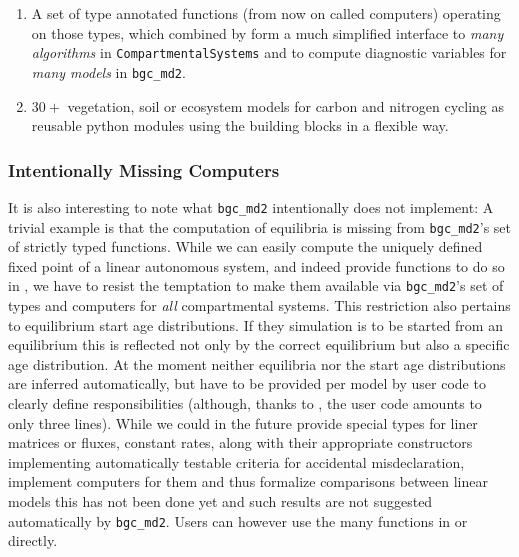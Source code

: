 \begin{enumerate}
\begin{figure}[h]
      \label{fig:subsystems}
      \end{figure}
      
    \item
      A set of type annotated functions (from now on called computers) operating on those types,  which combined
      by \ComputabilityGraphs{} form a much simplified 
      interface to \emph{many  algorithms} in \texttt{CompartmentalSystems} and \LAPM{} to compute diagnostic variables
      for \emph{many models} in \texttt{bgc\_md2}.
    \item
    $30+$ vegetation, soil or ecosystem models for carbon and nitrogen cycling
      as reusable python modules using the building blocks in a flexible way. 
  \end{enumerate}

\subsubsection{Intentionally Missing Computers}
It is also interesting to note what \texttt{bgc\_md2} intentionally does not implement:
A trivial example is that the computation of equilibria is missing from \texttt{bgc\_md2}'s set of strictly typed functions. 
While we can easily compute the uniquely defined fixed point of a linear
autonomous system, and indeed provide functions to do so in \LAPM{}, we have to
resist the temptation to make them available via \texttt{bgc\_md2}'s set of
types and computers for \emph{all} compartmental systems. 
This restriction also pertains to equilibrium start age distributions. 
If they simulation is to be started from an equilibrium this is reflected not only by the correct equilibrium
but also a specific age distribution.  
At the moment neither equilibria nor the start age distributions 
are inferred automatically, but have to be provided per model by 
user code to clearly define responsibilities (although, thanks to \LAPM{}, the user code amounts to only three lines).
While we could in the future provide special types for liner matrices or
fluxes, constant rates, along with their appropriate constructors implementing
automatically testable criteria for accidental misdeclaration, implement
computers for them and thus formalize comparisons between linear models
this has not been done yet and such results are not suggested automatically by \texttt{bgc\_md2}.
Users can however use the many functions in \LAPM{} or \CompartmentalSystems{} directly.

